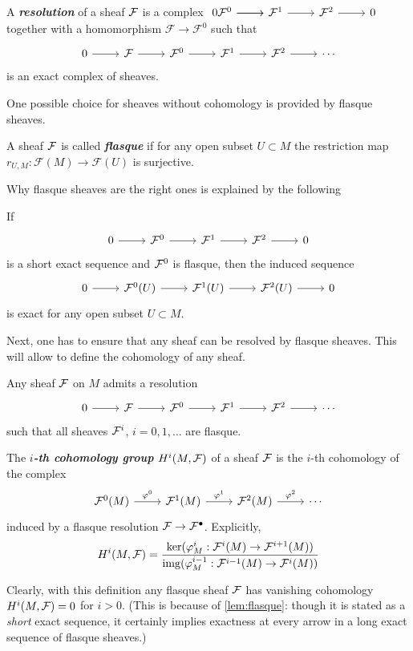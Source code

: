 \begin{defn}
	A \textbf{\textit{resolution}} of a sheaf $\mathcal{F}$ is a complex  
	$\begin{tikzcd}
		0\arrow[r]\mathcal{F}^0\arrow[r]&\mathcal{F}^1\arrow[r]&\Fc^2\arrow[r]&0
	\end{tikzcd}$ together with a homomorphism $\mathcal{F}\to\mathcal{F}^0$ such that
	\[\begin{tikzcd}
		0\arrow[r]&\mathcal{F}\arrow[r]&\mathcal{F}^0\arrow[r]&\mathcal{F}^1\arrow[r]&\mathcal{F}^2\arrow[r]&\cdots
	\end{tikzcd}\]
	is an exact complex of sheaves.
\end{defn}
One possible choice for sheaves without cohomology is provided by flasque sheaves.
\begin{defn}
	A sheaf $\mathcal{F}$ is called \textbf{\textit{flasque}} if for any open subset $U\subset M$ the restriction map $r_{U,M}:\mathcal{F}(M)\to\mathcal{F}(U)$ is surjective.
\end{defn}
Why flasque sheaves are the right ones is explained by the following
\begin{lemma}\label{lem:flasque}
	If
	\[\begin{tikzcd}
		0\arrow[r]&\Fc^0\arrow[r]&\Fc^1\arrow[r]&\Fc^2\arrow[r]&0
	\end{tikzcd}\]
	is a short exact sequence and $\mathcal{F}^0$ is flasque, then the induced sequence
	\[\begin{tikzcd}
		0\arrow[r]&\Fc^0(U)\arrow[r]&\Fc^1(U)\arrow[r]&\Fc^2(U)\arrow[r]&0
	\end{tikzcd}\]
	is exact for any open subset $U\subset M$.
\end{lemma}
Next, one has to ensure that any sheaf can be resolved by flasque sheaves. This will allow to define the cohomology of any sheaf.
\begin{prop}\label{prop:flasque-resolutions}
	Any sheaf $\mathcal{F}$ on $M$ admits a resolution
	\[\begin{tikzcd}
		0\arrow[r]&\Fc\arrow[r]&\Fc^0\arrow[r]&\Fc^1\arrow[r]&\Fc^2\arrow[r]&\cdots
	\end{tikzcd}\]
	such that all sheaves $\mathcal{F}^i$, $i=0,1,\ldots$ are flasque.
\end{prop}
\begin{defn}
	The \textbf{\textit{$i$-th cohomology group $H^i(M,\mathcal{F})$}} of a sheaf $\mathcal{F}$ is the $i$-th cohomology of the complex
	\[\begin{tikzcd}
		\Fc^0(M)\arrow[r,"\varphi^0"]&\Fc^1(M)\arrow[r,"\varphi^1"]&\Fc^2(M)\arrow[r,"\varphi^2"]&\cdots
	\end{tikzcd}\]
	{\color{cyan}induced by a flasque resolution} $\mathcal{F}\to\mathcal{F}^\bullet$. Explicitly,
	\[H^i(M,\mathcal{F})=\dfrac{\ker(\varphi^i_M:\mathcal{F}^i(M)\to\mathcal{F}^{i+1}(M))}{\operatorname{img}(\varphi^{i-1}_M:\mathcal{F}^{i-1}(M)\to\mathcal{F}^i(M))}\]
\end{defn}
Clearly, with this definition any flasque sheaf $\mathcal{F}$ has vanishing cohomology $H^i(M,\mathcal{F})=0$ for $i>0$. (This is because of \cref{lem:flasque}: though it is stated as a \textit{short} exact sequence, it certainly implies exactness at every arrow in a long exact sequence of flasque sheaves.)


